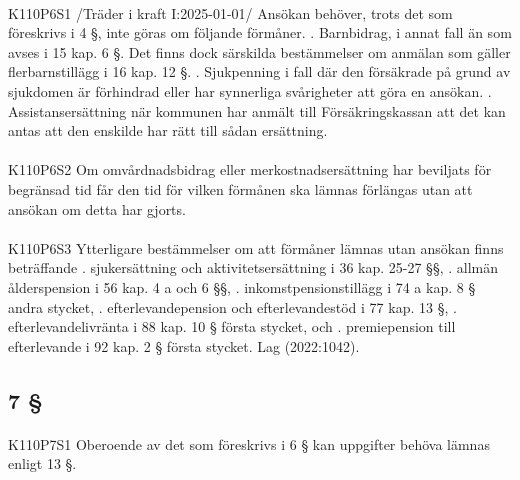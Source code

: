 \documentclass[a4paper,notitlepage,openany,10pt]{book}
\begin{document}
\paragraph*{}
{\tiny K110P6S1}
/Träder i kraft I:2025-01-01/
Ansökan behöver, trots det som föreskrivs i 4 §, inte göras om följande förmåner.
. Barnbidrag, i annat fall än som avses i 15 kap. 6 §. Det finns dock särskilda bestämmelser om anmälan som gäller flerbarnstillägg i 16 kap. 12 §.
. Sjukpenning i fall där den försäkrade på grund av sjukdomen är förhindrad eller har synnerliga svårigheter att göra en ansökan.
. Assistansersättning när kommunen har anmält till Försäkringskassan att det kan antas att den enskilde har rätt till sådan ersättning.
\paragraph*{}
{\tiny K110P6S2}
Om omvårdnadsbidrag eller merkostnadsersättning har beviljats för begränsad tid får den tid för vilken förmånen ska lämnas förlängas utan att ansökan om detta har gjorts.
\paragraph*{}
{\tiny K110P6S3}
Ytterligare bestämmelser om att förmåner lämnas utan ansökan finns beträffande
. sjukersättning och aktivitetsersättning i 36 kap. 25-27 §§,
. allmän ålderspension i 56 kap. 4 a och 6 §§,
. inkomstpensionstillägg i 74 a kap. 8 § andra stycket,
. efterlevandepension och efterlevandestöd i 77 kap. 13 §,
. efterlevandelivränta i 88 kap. 10 § första stycket, och
. premiepension till efterlevande i 92 kap. 2 § första stycket.
Lag (2022:1042).
\subsection*{7 §}
\paragraph*{}
{\tiny K110P7S1}
Oberoende av det som föreskrivs i 6 § kan uppgifter behöva lämnas enligt 13 §.
\end{document}
